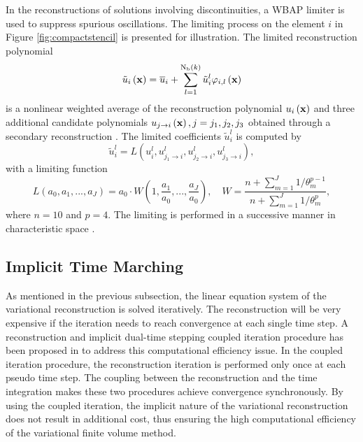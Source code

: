 In the reconstructions of solutions involving discontinuities, a WBAP limiter \cite{li2011multi,li2012multi} is used to suppress spurious oscillations. The limiting process on the element $i$ in Figure \ref{fig:compactstencil} is presented for illustration. The limited reconstruction polynomial
\begin{equation}\label{eqn:Limited_Polynomial}
	\tilde{u}_{i} \left(\mathbf{x}\right) = \overline{u}_{i} + \sum_{l=1}^{\mathrm{N_b}\left(k\right)} \tilde{u}_i^l \varphi_{i,l}  \left(\mathbf{x}\right)
\end{equation}
is a nonlinear weighted average of the reconstruction polynomial $u_i \left(\mathbf{x}\right)$ and three additional candidate polynomials $u_{j \rightarrow i} \left(\mathbf{x}\right), j=j_1, j_2, j_3$ obtained through a secondary reconstruction \cite{li2012high}. The limited coefficients $\tilde{u}^l_i$ is computed by
\begin{equation}\label{eq:Limiting}
	\tilde{u}_i^l= L\left(u_i^l, u^l_{j_1 \rightarrow i}, u^l_{j_2 \rightarrow i}, u^l_{j_3 \rightarrow i}\right),
\end{equation} 
with a limiting function
\begin{equation}
	L(a_0,a_1,...,a_J)=a_0\cdot{W\left(1,\frac{a_1}{a_0},...,\frac{a_J}{a_0}\right)}, \quad W=\frac{n+\sum_{m=1}^{J}{1/\theta_m^{p-1}}}{n+\sum_{m=1}^{J}{1/\theta_m^{p}}},
\end{equation}
where $n=10$ and $p=4$. The limiting is performed in a successive manner in characteristic space \cite{li2012multi}.

\subsection{Implicit Time Marching}
\label{ssec:TimeMarching}

As mentioned in the previous subsection, the linear equation system of the variational reconstruction is solved iteratively. The reconstruction will be very expensive if the iteration needs to reach convergence at each single time step. A reconstruction and implicit dual-time stepping coupled iteration procedure has been proposed in \cite{wang2016compact1_VR} to address this computational efficiency issue. In the coupled iteration procedure, the reconstruction iteration is performed only once at each pseudo time step. The coupling between the reconstruction and the time integration makes these two procedures achieve convergence synchronously. By using the coupled iteration, the implicit nature of the variational reconstruction does not result in additional cost, thus ensuring the high computational efficiency of the variational finite volume method. 

